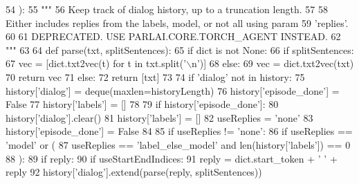 \begin{DoxyCode}
54 ):
55     \textcolor{stringliteral}{"""}
56 \textcolor{stringliteral}{    Keep track of dialog history, up to a truncation length.}
57 \textcolor{stringliteral}{}
58 \textcolor{stringliteral}{    Either includes replies from the labels, model, or not all using param}
59 \textcolor{stringliteral}{    'replies'.}
60 \textcolor{stringliteral}{}
61 \textcolor{stringliteral}{    DEPRECATED. USE PARLAI.CORE.TORCH\_AGENT INSTEAD.}
62 \textcolor{stringliteral}{    """}
63 
64     \textcolor{keyword}{def }parse(txt, splitSentences):
65         \textcolor{keywordflow}{if} dict \textcolor{keywordflow}{is} \textcolor{keywordflow}{not} \textcolor{keywordtype}{None}:
66             \textcolor{keywordflow}{if} splitSentences:
67                 vec = [dict.txt2vec(t) \textcolor{keywordflow}{for} t \textcolor{keywordflow}{in} txt.split(\textcolor{stringliteral}{'\(\backslash\)n'})]
68             \textcolor{keywordflow}{else}:
69                 vec = dict.txt2vec(txt)
70             \textcolor{keywordflow}{return} vec
71         \textcolor{keywordflow}{else}:
72             \textcolor{keywordflow}{return} [txt]
73 
74     \textcolor{keywordflow}{if} \textcolor{stringliteral}{'dialog'} \textcolor{keywordflow}{not} \textcolor{keywordflow}{in} history:
75         history[\textcolor{stringliteral}{'dialog'}] = deque(maxlen=historyLength)
76         history[\textcolor{stringliteral}{'episode\_done'}] = \textcolor{keyword}{False}
77         history[\textcolor{stringliteral}{'labels'}] = []
78 
79     \textcolor{keywordflow}{if} history[\textcolor{stringliteral}{'episode\_done'}]:
80         history[\textcolor{stringliteral}{'dialog'}].clear()
81         history[\textcolor{stringliteral}{'labels'}] = []
82         useReplies = \textcolor{stringliteral}{'none'}
83         history[\textcolor{stringliteral}{'episode\_done'}] = \textcolor{keyword}{False}
84 
85     \textcolor{keywordflow}{if} useReplies != \textcolor{stringliteral}{'none'}:
86         \textcolor{keywordflow}{if} useReplies == \textcolor{stringliteral}{'model'} \textcolor{keywordflow}{or} (
87             useReplies == \textcolor{stringliteral}{'label\_else\_model'} \textcolor{keywordflow}{and} len(history[\textcolor{stringliteral}{'labels'}]) == 0
88         ):
89             \textcolor{keywordflow}{if} reply:
90                 \textcolor{keywordflow}{if} useStartEndIndices:
91                     reply = dict.start\_token + \textcolor{stringliteral}{' '} + reply
92                 history[\textcolor{stringliteral}{'dialog'}].extend(parse(reply, splitSentences))

\end{DoxyCode}
